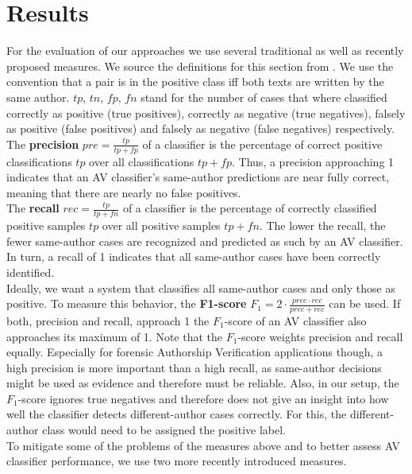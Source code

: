 \chapter{Results}\label{results}
For the evaluation of our approaches we use several traditional as well as recently proposed measures.
We source the definitions for this section from \cite{schutze2008introduction}.
We use the convention that a pair is in the positive class iff both texts are written by the same author.
$tp$, $tn$, $fp$, $fn$ stand for the number of cases that where classified correctly as positive (true positives), correctly as negative (true negatives), falsely as positive (false positives) and falsely as negative (false negatives) respectively.\\
The \textbf{precision} $pre = \frac{tp}{tp+fp}$ of a classifier is the percentage of correct positive classifications $tp$ over all classifications $tp+fp$.
Thus, a precision approaching 1 indicates that an AV classifier's same-author predictions are near fully correct, meaning that there are nearly no false positives.\\
The \textbf{recall} $rec = \frac{tp}{tp+fn}$ of a classifier is the percentage of correctly classified positive samples $tp$ over all positive samples $tp+fn$.
The lower the recall, the fewer same-author cases are recognized and predicted as such by an AV classifier.
In turn, a recall of 1 indicates that all same-author cases have been correctly identified.\\
Ideally, we want a system that classifies all same-author cases and only those as positive.
To measure this behavior, the \textbf{F1-score} $F_1 = 2\cdot\frac{prec\cdot{}rec}{prec+rec}$ can be used.
If both, precision and recall, approach 1 the $F_1$-score of an AV classifier also approaches its maximum of 1.
Note that the $F_1$-score weights precision and recall equally.
Especially for forensic Authorship Verification applications though, a high precision is more important than a high recall, as same-author decisions might be used as evidence and therefore must be reliable.
Also, in our setup, the $F_1$-score ignores true negatives and therefore does not give an insight into how well the classifier detects different-author cases correctly.
For this, the different-author class would need to be assigned the positive label.\\
To mitigate some of the problems of the measures above and to better assess AV classifier performance, we use two more recently introduced measures.
